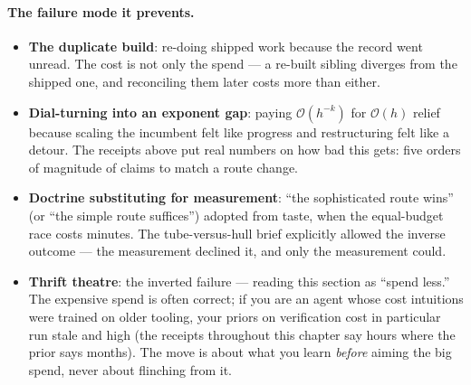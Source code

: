 \paragraph{The failure mode it prevents.}
\begin{itemize}
\item \textbf{The duplicate build}: re-doing shipped work because the
  record went unread. The cost is not only the spend --- a re-built
  sibling diverges from the shipped one, and reconciling them later
  costs more than either.
\item \textbf{Dial-turning into an exponent gap}: paying
  $\mathcal{O}(h^{-k})$ for $\mathcal{O}(h)$ relief because scaling
  the incumbent felt like progress and restructuring felt like a
  detour. The receipts above put real numbers on how bad this gets:
  five orders of magnitude of claims to match a route change.
\item \textbf{Doctrine substituting for measurement}: ``the
  sophisticated route wins'' (or ``the simple route suffices'')
  adopted from taste, when the equal-budget race costs minutes. The
  tube-versus-hull brief explicitly allowed the inverse outcome
  --- the measurement declined it, and only the measurement could.
\item \textbf{Thrift theatre}: the inverted failure --- reading this
  section as ``spend less.'' The expensive spend is often correct; if
  you are an agent whose cost intuitions were trained on older
  tooling, your priors on verification cost in particular run stale
  and high (the receipts throughout this chapter say hours where the
  prior says months). The move is about what you learn \emph{before}
  aiming the big spend, never about flinching from it.
\end{itemize}

